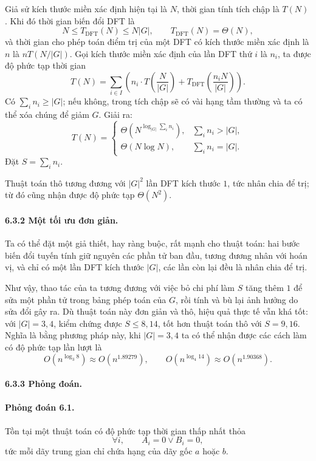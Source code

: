 \documentclass[11pt]{article}
\begin{document}
Giả sử kích thước miền xác định hiện tại là \(N\), thời gian tính tích chập là
\(T(N)\). Khi đó thời gian biến đổi DFT là
\[
  N\le T_{\mathrm{DFT}}(N)\le N|G|,\qquad T_{\mathrm{DFT}}(N)=\Theta(N),
\]
và thời gian cho phép toán điểm trị của một DFT có kích thước miền xác định là
\(n\) là \(nT(N/|G|)\). Gọi kích thước miền xác định của lần DFT thứ \(i\) là
\(n_i\), ta được độ phức tạp thời gian
\[
  T(N)=\sum_{i\in I}\left(
  n_i\cdot T\left(\frac{N}{|G|}\right)
  +T_{\mathrm{DFT}}\left(\frac{n_iN}{|G|}\right)\right).
\]
Có \(\sum_i n_i\ge |G|\); nếu không, trong tích chập sẽ có vài hạng tầm thường
và ta có thể xóa chúng để giảm \(G\). Giải ra:
\[
  T(N)=
  \begin{cases}
    \Theta\!\left(N^{\log_{|G|}\sum_i n_i}\right), & \sum_i n_i>|G|,\\
    \Theta(N\log N), & \sum_i n_i=|G|.
  \end{cases}
\]
Đặt \(S=\sum_i n_i\).

Thuật toán thô tương đương với \(|G|^2\) lần DFT kích thước \(1\), tức nhân chia
để trị; từ đó cũng nhận được độ phức tạp \(\Theta(N^2)\).

\paragraph{6.3.2 Một tối ưu đơn giản.}
Ta có thể đặt một giả thiết, hay ràng buộc, rất mạnh cho thuật toán: hai bước
biến đổi tuyến tính giữ nguyên các phần tử ban đầu, tương đương nhân với hoán
vị, và chỉ có một lần DFT kích thước \(|G|\), các lần còn lại đều là nhân chia
để trị.

Như vậy, thao tác của ta tương đương với việc bỏ chi phí làm \(S\) tăng thêm
\(1\) để sửa một phần tử trong bảng phép toán của \(G\), rồi tính và bù lại ảnh
hưởng do sửa đổi gây ra. Dù thuật toán này đơn giản và thô, hiệu quả thực tế
vẫn khá tốt: với \(|G|=3,4\), kiểm chứng được \(S\le8,14\), tốt hơn thuật toán
thô với \(S=9,16\). Nghĩa là bằng phương pháp này, khi \(|G|=3,4\) ta có thể
nhận được các cách làm có độ phức tạp lần lượt là
\[
  O(n^{\log_3 8})\approx O(n^{1.89279}),\qquad
  O(n^{\log_4 14})\approx O(n^{1.90368}).
\]

\paragraph{6.3.3 Phỏng đoán.}

\paragraph{Phỏng đoán 6.1.}
Tồn tại một thuật toán có độ phức tạp thời gian thấp nhất thỏa
\[
  \forall i,\qquad A_i=0\lor B_i=0,
\]
tức mỗi dãy trung gian chỉ chứa hạng của dãy gốc \(a\) hoặc \(b\).
\end{document}
